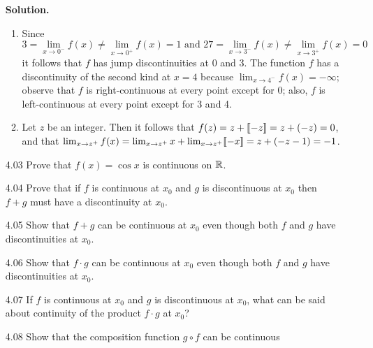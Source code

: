 \begin{enumerate}
      \textbf{Solution.}
      
      \begin{enumerate}
         \item Since
               $$3 = \lim_{x\rightarrow 0^-} f(x) \neq
                     \lim_{x\rightarrow 0^+} f(x) = 1
                 \text{ and }
                 27 = \lim_{x\rightarrow 3^-} f(x) \neq
                      \lim_{x\rightarrow 3^+} f(x) = 0$$
               it follows that $f$ has jump discontinuities at 0 and 3. The
               function $f$ has a discontinuity of the second kind at $x = 4$
               because $\lim_{x\rightarrow 4^-} f(x) = -\infty$; observe that
               $f$ is right-continuous at every point except for 0; also, $f$ is
               left-continuous at every point except for 3 and 4.
         \item Let $z$ be an integer. Then it follows that
               $f(z) = z + \lbrack\!\lbrack -z \rbrack\!\rbrack = z + (-z) = 0$, and that
               $\lim_{x\rightarrow z^+} f(x) = \lim_{x\rightarrow z^+} x +
               \lim_{x\rightarrow z^+} \lbrack\!\lbrack -x \rbrack\!\rbrack = z + (-z-1) = -1$.
      \end{enumerate}
   \item[4.03] Prove that $f(x) = \cos {x}$ is continuous on $\mathbb{R}$.
   \item[4.04] Prove that if $f$ is continuous at $x_0$ and $g$ is discontinuous
               at $x_0$ then $f + g$ must have a discontinuity at $x_0$.
   \item[4.05] Show that $f + g$ can be continuous at $x_0$ even though both $f$
               and $g$ have discontinuities at $x_0$.
   \item[4.06] Show that $f \cdot g$ can be continuous at $x_0$ even though 
               both $f$ and $g$ have discontinuities at $x_0$.
   \item[4.07] If $f$ is continuous at $x_0$ and $g$ is discontinuous at $x_0$,
               what can be said about continuity of the product $f \cdot g$ at
               $x_0$?
   \item[4.08] Show that the composition function $g \circ f$ can be continuous

\end{enumerate}

